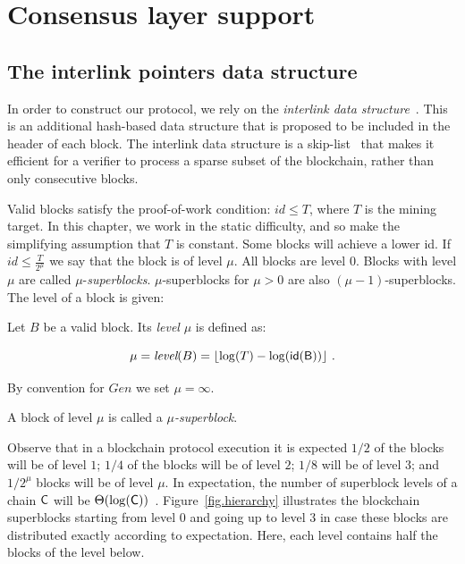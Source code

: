 \section{Consensus layer support} \label{sec:consensus}


\subsection{The interlink pointers data structure}
\label{sec:interlink}

In order to construct our protocol, we rely on the \emph{interlink data
structure}~\cite{popow}. This is an additional hash-based data
structure that is proposed to be included in the header of each block. The
interlink data structure is a skip-list~\cite{skiplist} that makes it efficient
for a verifier to process a sparse subset of the blockchain, rather than only
consecutive blocks.

Valid blocks satisfy the proof-of-work condition: $id \leq T$, where $T$ is the
mining target. In this chapter, we work in the static difficulty, and so make
the simplifying assumption that $T$ is constant. Some blocks will achieve a
lower id. If $id \leq \frac{T}{2^\mu}$ we say that the block is of level $\mu$.
All blocks are level $0$. Blocks with level $\mu$ are called
$\mu$-\emph{superblocks}. $\mu$-superblocks for $\mu > 0$ are also $(\mu -
1)$-superblocks. The level of a block is given:

\begin{definition}[Level]
  Let $B$ be a valid block. Its \emph{level} $\mu$ is defined as:

  \[
  \mu = \emph{level}(B) = \left \lfloor \log(T) -
\log(\sf{id}(B)) \right \rfloor
  \,.
  \]

  By convention for $Gen$ we set $\mu = \infty$.
\end{definition}

\begin{definition}[Superblock]
  A block of level $\mu$ is called a \emph{$\mu$-superblock}.
\end{definition}

Observe that in a blockchain protocol execution it is expected $1/2$ of the
blocks will be of level $1$; $1/4$ of the blocks will be of level $2$; $1/8$
will be of level $3$; and $1/2^\mu$ blocks will be of level $\mu$. In
expectation, the number of superblock levels of a chain $\mathsf{C}$ will be
$\Theta(\log(\mathsf{C}))$~\cite{popow}. Figure~\ref{fig.hierarchy} illustrates the
blockchain superblocks starting from level $0$ and going up to level $3$ in case
these blocks are distributed exactly according to expectation. Here, each level
contains half the blocks of the level below.


